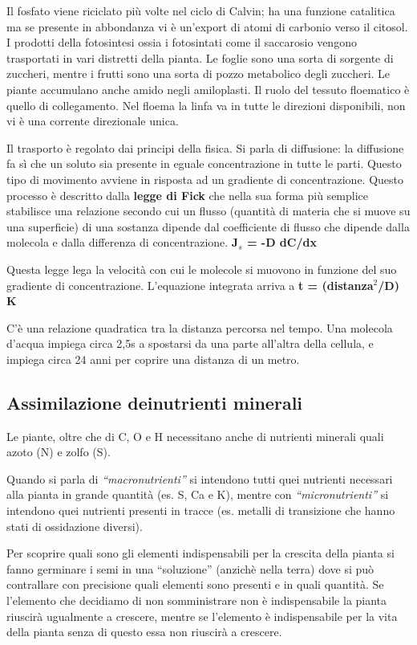 \documentclass[]{article}
\begin{document}
Il fosfato viene riciclato più volte nel ciclo di Calvin; ha una
funzione catalitica ma se presente in abbondanza vi è un'export di atomi
di carbonio verso il citosol. I prodotti della fotosintesi ossia i
fotosintati come il saccarosio vengono trasportati in vari distretti
della pianta. Le foglie sono una sorta di sorgente di zuccheri, mentre i
frutti sono una sorta di pozzo metabolico degli zuccheri. Le piante
accumulano anche amido negli amiloplasti. Il ruolo del tessuto
floematico è quello di collegamento. Nel floema la linfa va in tutte le
direzioni disponibili, non vi è una corrente direzionale unica.

Il trasporto è regolato dai principi della fisica. Si parla di
diffusione: la diffusione fa sì che un soluto sia presente in eguale
concentrazione in tutte le parti. Questo tipo di movimento avviene in
risposta ad un gradiente di concentrazione. Questo processo è descritto
dalla \textbf{legge di Fick} che nella sua forma più semplice stabilisce
una relazione secondo cui un flusso (quantità di materia che si muove su
una superficie) di una sostanza dipende dal coefficiente di flusso che
dipende dalla molecola e dalla differenza di concentrazione.
\textbf{J$_s$ = -D dC/dx}

Questa legge lega la velocità con cui le molecole si muovono in funzione
del suo gradiente di concentrazione. L'equazione integrata arriva a
\textbf{t = (distanza$^2$/D) K}

C'è una relazione quadratica tra la distanza percorsa nel tempo. Una
molecola d'acqua impiega circa 2,5s a spostarsi da una parte all'altra
della cellula, e impiega circa 24 anni per coprire una distanza di un
metro.

\subsection{Assimilazione deinutrienti
minerali}\label{assimilazione-deinutrienti-minerali}

Le piante, oltre che di C, O e H necessitano anche di nutrienti minerali
quali azoto (N) e zolfo (S).

Quando si parla di \emph{``macronutrienti''} si intendono tutti quei
nutrienti necessari alla pianta in grande quantità (es. S, Ca e K),
mentre con \emph{``micronutrienti''} si intendono quei nutrienti
presenti in tracce (es. metalli di transizione che hanno stati di
ossidazione diversi).

Per scoprire quali sono gli elementi indispensabili per la crescita
della pianta si fanno germinare i semi in una ``soluzione'' (anzichè
nella terra) dove si può contrallare con precisione quali elementi sono
presenti e in quali quantità. Se l'elemento che decidiamo di non
somministrare non è indispensabile la pianta riuscirà ugualmente a
crescere, mentre se l'elemento è indispensabile per la vita della pianta
senza di questo essa non riuscirà a crescere.
\end{document}
